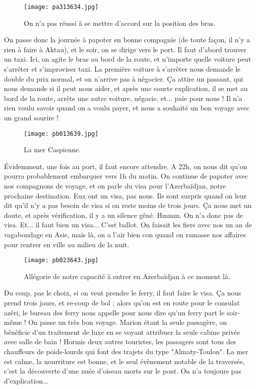 \documentclass{book}
\begin{document}
\begin{figure}[h]
\centering
\texttt{[image: pa313634.jpg]}
\caption*{On n'a pas réussi à se mettre d'accord sur la position des bras.}
\end{figure}

On passe donc la journée à papoter en bonne compagnie (de toute façon, il n'y a rien à faire à Aktau), et le soir, on se dirige vers le port. Il faut d'abord trouver un taxi. Ici, on agite le bras au bord de la route, et n'importe quelle voiture peut s'arrêter et s'improviser taxi. La première voiture à s'arrêter nous demande le double du prix normal, et on n'arrive pas à négocier. Ça attire un passant, qui nous demande si il peut nous aider, et après une courte explication, il se met au bord de la route, arrête une autre voiture, négocie, et... paie pour nous ! Il n'a rien voulu savoir quand on a voulu payer, et nous a souhaité un bon voyage avec un grand sourire !


\begin{figure}[h]
\centering
\texttt{[image: pb013639.jpg]}
\caption*{La mer Caspienne.}
\end{figure}

Évidemment, une fois au port, il faut encore attendre. A 22h, on nous dit qu'on pourra probablement embarquer vers 1h du matin. On continue de papoter avec nos compagnons de voyage, et on parle du visa pour l’Azerbaïdjan, notre prochaine destination. Eux ont un visa, pas nous. Ils sont surpris quand on leur dit qu'il n'y a pas besoin de visa si on reste moins de trois jours. Ça nous met un doute, et après vérification, il y a un silence gêné. Hmmm. On n'a donc pas de visa. Et... il faut bien un visa... C'est ballot. On faisait les fiers avec nos un an de vagabondage en Asie, mais là, on a l'air bien con quand on ramasse nos affaires pour rentrer en ville au milieu de la nuit.


\begin{figure}[h]
\centering
\texttt{[image: pb023643.jpg]}
\caption*{Allégorie de notre capacité à entrer en Azerbaïdjan à ce moment là.}
\end{figure}

Du coup, pas le choix, si on veut prendre le ferry, il faut faire le visa. Ça nous prend trois jours, et re-coup de bol : alors qu'on est en route pour le consulat azéri, le bureau des ferry nous appelle pour nous dire qu'un ferry part le soir-même ! On passe un très bon voyage. Marion étant la seule passagère, on bénéficie d'un traitement de luxe en se voyant attribuer la seule cabine privée avec salle de bain ! Hormis deux autres touristes, les passagers sont tous des chauffeurs de poids-lourds qui font des trajets du type "Almaty-Toulon". La mer est calme, la nourriture est bonne, et le seul évènement notable de la traversée, c'est la découverte d'une nuée d'oiseau morts sur le pont. On n'a toujours pas d'explication...
\end{document}
